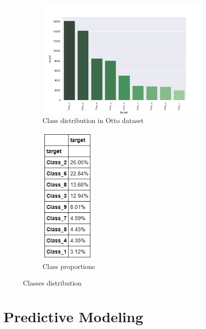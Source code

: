 \documentclass[a4paper,english,12pt]{article}
\begin{document}
\begin{figure}[H]
	\centering
	\begin{subfigure}{0.4\textwidth}
		\centering
		\includegraphics[width=0.95\textwidth]{target}
		\caption{Class distribution in Otto dataset}
		\label{target}
	\end{subfigure}
	\begin{subfigure}{0.4\textwidth}
		\centering
		\includegraphics[width=0.3\textwidth]{class_dist}
		\caption{Class proportions}
		\label{class_dist}
	\end{subfigure}
\caption{Classes distribution}
\end{figure}


\section{Predictive Modeling}
\end{document}
